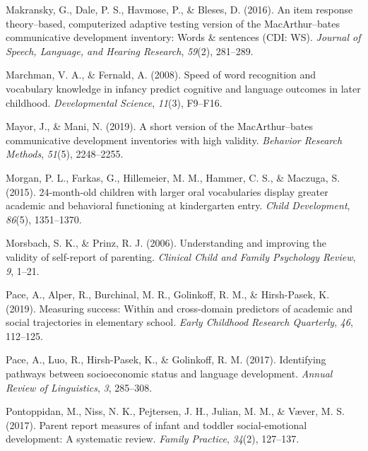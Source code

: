 \documentclass[
  man,floatsintext]{apa6}
\newlength{\cslhangindent}
\newlength{\cslentryspacingunit} %
\newenvironment{CSLReferences}[2] %
 {%
  \setlength{\parindent}{0pt}
  \ifodd #1
  \let\oldpar\par
  \def\par{\hangindent=\cslhangindent\oldpar}
  \fi
  \setlength{\parskip}{#2\cslentryspacingunit}
 }%
 {}
\begin{document}
\begin{CSLReferences}{1}{0}
\leavevmode{}%
Makransky, G., Dale, P. S., Havmose, P., \& Bleses, D. (2016). An item response theory--based, computerized adaptive testing version of the MacArthur--bates communicative development inventory: Words \& sentences (CDI: WS). \emph{Journal of Speech, Language, and Hearing Research}, \emph{59}(2), 281--289.

\leavevmode{}%
Marchman, V. A., \& Fernald, A. (2008). Speed of word recognition and vocabulary knowledge in infancy predict cognitive and language outcomes in later childhood. \emph{Developmental Science}, \emph{11}(3), F9--F16.

\leavevmode{}%
Mayor, J., \& Mani, N. (2019). A short version of the MacArthur--bates communicative development inventories with high validity. \emph{Behavior Research Methods}, \emph{51}(5), 2248--2255.

\leavevmode{}%
Morgan, P. L., Farkas, G., Hillemeier, M. M., Hammer, C. S., \& Maczuga, S. (2015). 24-month-old children with larger oral vocabularies display greater academic and behavioral functioning at kindergarten entry. \emph{Child Development}, \emph{86}(5), 1351--1370.

\leavevmode{}%
Morsbach, S. K., \& Prinz, R. J. (2006). Understanding and improving the validity of self-report of parenting. \emph{Clinical Child and Family Psychology Review}, \emph{9}, 1--21.

\leavevmode{}%
Pace, A., Alper, R., Burchinal, M. R., Golinkoff, R. M., \& Hirsh-Pasek, K. (2019). Measuring success: Within and cross-domain predictors of academic and social trajectories in elementary school. \emph{Early Childhood Research Quarterly}, \emph{46}, 112--125.

\leavevmode{}%
Pace, A., Luo, R., Hirsh-Pasek, K., \& Golinkoff, R. M. (2017). Identifying pathways between socioeconomic status and language development. \emph{Annual Review of Linguistics}, \emph{3}, 285--308.

\leavevmode{}%
Pontoppidan, M., Niss, N. K., Pejtersen, J. H., Julian, M. M., \& Væver, M. S. (2017). Parent report measures of infant and toddler social-emotional development: A systematic review. \emph{Family Practice}, \emph{34}(2), 127--137.


\end{CSLReferences}
\end{document}
